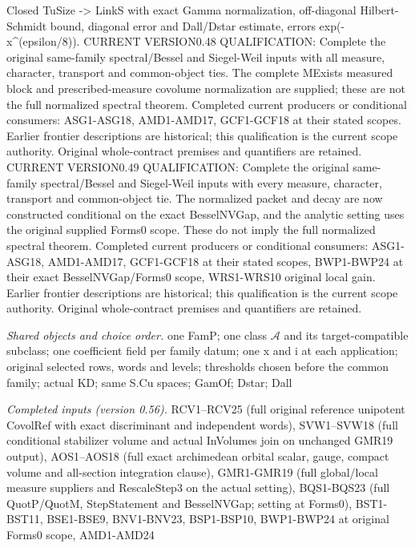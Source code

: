 Closed TuSize -> LinkS with exact Gamma normalization, off-diagonal Hilbert-Schmidt bound, diagonal error and Dall/Dstar estimate, errors exp(-x\textasciicircum{}(epsilon/8)). CURRENT VERSION0.48 QUALIFICATION: Complete the original same-family spectral/Bessel and Siegel-Weil inputs with all measure, character, transport and common-object ties. The complete MExists measured block and prescribed-measure covolume normalization are supplied; these are not the full normalized spectral theorem. Completed current producers or conditional consumers: ASG1-ASG18, AMD1-AMD17, GCF1-GCF18 at their stated scopes. Earlier frontier descriptions are historical; this qualification is the current scope authority. Original whole-contract premises and quantifiers are retained. CURRENT VERSION0.49 QUALIFICATION: Complete the original same-family spectral/Bessel and Siegel-Weil inputs with every measure, character, transport and common-object tie. The normalized packet and decay are now constructed conditional on the exact BesselNVGap, and the analytic setting uses the original supplied Forms0 scope. These do not imply the full normalized spectral theorem. Completed current producers or conditional consumers: ASG1-ASG18, AMD1-AMD17, GCF1-GCF18 at their stated scopes, BWP1-BWP24 at their exact BesselNVGap/Forms0 scope, WRS1-WRS10 original local gain. Earlier frontier descriptions are historical; this qualification is the current scope authority. Original whole-contract premises and quantifiers are retained.

\emph{Shared objects and choice order.} one FamP; one class $\mathcal A$ and its target-compatible subclass; one coefficient field per family datum; one x and i at each application; original selected rows, words and levels; thresholds chosen before the common family; actual KD; same S.Cu spaces; GamOf; Dstar; Dall

\emph{Completed inputs (version 0.56).} RCV1–RCV25 (full original reference unipotent CovolRef with exact discriminant and independent words), SVW1–SVW18 (full conditional stabilizer volume and actual InVolumes join on unchanged GMR19 output), AOS1–AOS18 (full exact archimedean orbital scalar, gauge, compact volume and all-section integration clause), GMR1-GMR19 (full global/local measure suppliers and RescaleStep3 on the actual setting), BQS1-BQS23 (full QuotP/QuotM, StepStatement and BesselNVGap; setting at Forms0), BST1-BST11, BSE1-BSE9, BNV1-BNV23, BSP1-BSP10, BWP1-BWP24 at original Forms0 scope, AMD1-AMD24

